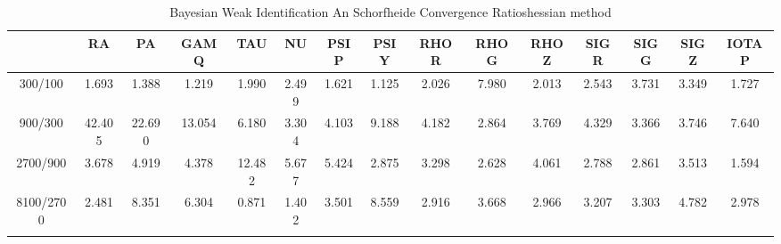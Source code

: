 \documentclass[a4paper,10pt]{article}
\begin{document}
\centering
\begin{longtable}{ccccccccccccccc}
\toprule
 & RA & PA & GAMQ & TAU & NU & PSIP & PSIY & RHOR & RHOG & RHOZ & SIGR & SIGG & SIGZ & IOTAP \\
\midrule
300/100 & 1.693 & 1.388 & 1.219 & 1.990 & 2.499 & 1.621 & 1.125 & 2.026 & 7.980 & 2.013 & 2.543 & 3.731 & 3.349 & 1.727 \\
900/300 & 42.405 & 22.690 & 13.054 & 6.180 & 3.304 & 4.103 & 9.188 & 4.182 & 2.864 & 3.769 & 4.329 & 3.366 & 3.746 & 7.640 \\
2700/900 & 3.678 & 4.919 & 4.378 & 12.482 & 5.677 & 5.424 & 2.875 & 3.298 & 2.628 & 4.061 & 2.788 & 2.861 & 3.513 & 1.594 \\
8100/2700 & 2.481 & 8.351 & 6.304 & 0.871 & 1.402 & 3.501 & 8.559 & 2.916 & 3.668 & 2.966 & 3.207 & 3.303 & 4.782 & 2.978 \\
\bottomrule
\caption{Bayesian Weak Identification An Schorfheide Convergence Ratioshessian method}
\label{table:tbl:WeakAnSchoConvergenceRatios_hessian}
\end{longtable}
\end{document}

